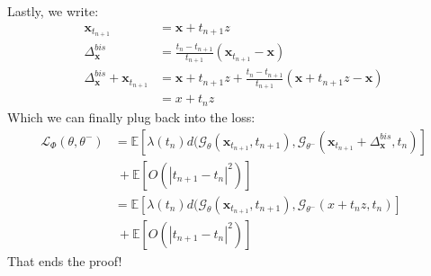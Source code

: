 \noindent Lastly, we write:
\begin{align}
    \mathbf{x}_{t_{n+1}} & = \mathbf{x} + t_{n+1}z \\
    \Delta_{\mathbf{x}}^{bis} &= \frac{t_n - t_{n+1} }{t_{n+1}}(\mathbf{x}_{t_{n +1}} - \mathbf{x}) \\
    \Delta_{\mathbf{x}}^{bis} + \mathbf{x}_{t_{n+1}} &= \mathbf{x} + t_{n+1}z +\frac{t_n - t_{n+1} }{t_{n+1}}(\mathbf{x} + t_{n+1}z - \mathbf{x}) \\
   & = x + t_{n}z 
\end{align}
\noindent Which we can finally plug back into the loss:
\begin{align}
    \mathcal{L}_{\Phi}(\theta, \theta^-) & = \mathbb{E}\left[ \lambda(t_n) d(\mathcal{G}_{\theta}(\mathbf{x}_{t_{n+1}}, t_{n+1}), \mathcal{G}_{\theta^-}(\mathbf{x}_{t_{n+1}} + \Delta_{\mathbf{x}}^{bis}, t_n) \right] \\
    & \: + \mathbb{E}\left[O(|t_{n+1} - t_n |^2) \right] \\
    & = \mathbb{E}\left[ \lambda(t_n) d(\mathcal{G}_{\theta}(\mathbf{x}_{t_{n+1}}, t_{n+1}), \mathcal{G}_{\theta^-}(x + t_{n}z , t_n) \right] \\ 
    & \: + \mathbb{E}\left[O(|t_{n+1} - t_n |^2) \right]  
\end{align}
\noindent That ends the proof! 
